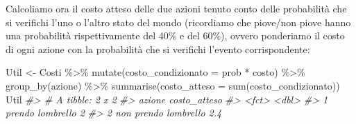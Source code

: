 \documentclass[
  11pt,
]{krantz}
\makeatletter
\newenvironment{Shaded}{\begin{snugshade}}{\end{snugshade}}
\newcommand{\AttributeTok}[1]{\textcolor[rgb]{0.61,0.61,0.61}{#1}}
\newcommand{\CommentTok}[1]{\textcolor[rgb]{0.37,0.37,0.37}{\textit{#1}}}
\newcommand{\DecValTok}[1]{\textcolor[rgb]{0.06,0.06,0.06}{#1}}
\newcommand{\FunctionTok}[1]{\textcolor[rgb]{0,0,0}{#1}}
\newcommand{\NormalTok}[1]{#1}
\newcommand{\OtherTok}[1]{\textcolor[rgb]{0.37,0.37,0.37}{#1}}
\newcommand{\SpecialCharTok}[1]{\textcolor[rgb]{0,0,0}{#1}}
\newenvironment{kframe}{%
\medskip{}
\setlength{\fboxsep}{.8em}
 \def\at@end@of@kframe{}%
 \ifinner\ifhmode%
  \def\at@end@of@kframe{\end{minipage}}%
  \begin{minipage}{\columnwidth}%
 \fi\fi%
 \def\FrameCommand##1{\hskip\@totalleftmargin \hskip-\fboxsep
 \colorbox{shadecolor}{##1}\hskip-\fboxsep
     \hskip-\linewidth \hskip-\@totalleftmargin \hskip\columnwidth}%
 \MakeFramed {\advance\hsize-\width
   \@totalleftmargin\z@ \linewidth\hsize
   \@setminipage}}%
 {\par\unskip\endMakeFramed%
 \at@end@of@kframe}
\renewenvironment{Shaded}{\begin{kframe}}{\end{kframe}}
\theoremstyle{definition}
\theoremstyle{definition}
\theoremstyle{definition}
\theoremstyle{definition}
\theoremstyle{remark}
\makeatother
\begin{document}
\begin{Shaded}
\end{Shaded}

Calcoliamo ora il costo atteso delle due azioni tenuto conto delle probabilità che si verifichi l'uno o l'altro stato del mondo (ricordiamo che piove/non piove hanno una probabilità rispettivamente del 40\% e del 60\%), ovvero ponderiamo il costo di ogni azione con la probabilità che si verifichi l'evento corrispondente:

\begin{Shaded}
\begin{Highlighting}[]
\NormalTok{Util }\OtherTok{\textless{}{-}}
\NormalTok{  Costi }\SpecialCharTok{\%\textgreater{}\%}
  \FunctionTok{mutate}\NormalTok{(}\AttributeTok{costo\_condizionato =}\NormalTok{ prob }\SpecialCharTok{*}\NormalTok{ costo) }\SpecialCharTok{\%\textgreater{}\%}
  \FunctionTok{group\_by}\NormalTok{(azione) }\SpecialCharTok{\%\textgreater{}\%}
  \FunctionTok{summarise}\NormalTok{(}\AttributeTok{costo\_atteso =} \FunctionTok{sum}\NormalTok{(costo\_condizionato))}
\NormalTok{Util}
\CommentTok{\#\textgreater{} \# A tibble: 2 x 2}
\CommentTok{\#\textgreater{}   azione                costo\_atteso}
\CommentTok{\#\textgreater{}   \textless{}fct\textgreater{}                        \textless{}dbl\textgreater{}}
\CommentTok{\#\textgreater{} 1 prendo l\textquotesingle{}ombrello              2  }
\CommentTok{\#\textgreater{} 2 non prendo l\textquotesingle{}ombrello          2.4}
\end{Highlighting}
\end{Shaded}
\end{document}
